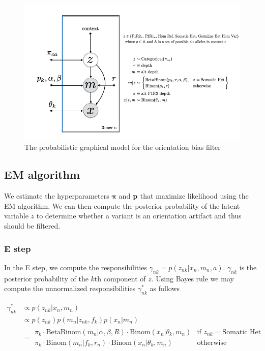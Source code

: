 \documentclass[a4paper]{article}
\newcommand{\vp}{{\bf p}}
\newcommand{\vpi}{{\bm \pi}}
\begin{document}
\begin{figure}
\centering
\includegraphics[width=1\textwidth]{pgm.png}
\caption{\label{fig:pgm} The probabilistic graphical model for the orientation bias filter}
\end{figure}


\subsection{EM algorithm}
We estimate the hyperparameters $\vpi$ and $\vp$ that maximize likelihood using the EM algorithm. We can then compute the posterior probability of the latent variable $z$ to determine whether a variant is an orientation artifact and thus should be filtered.

\subsubsection{E step}
In the E step, we compute the responsibilities $\gamma_{nk} = p(z_{nk} | x_n, m_n, a)$. $\gamma_{nk}$ is the posterior probability of the $k$th component of $z$. Using Bayes rule we may compute the unnormalized responsibilities $\gamma^*_{nk}$ as follows

\begin{align}
\gamma^*_{nk}  &\propto p(z_{nk} | x_n, m_n) \nonumber \\
		        &\propto p(z_{nk}) p(m_n | z_{nk}, f_{k} ) p(x_n | m_n ) \nonumber \\
		        &=  \begin{array}{ll}
        				\pi_{k} \cdot \mathrm{BetaBinom}(m_n | \alpha, \beta, R) \cdot \mathrm{Binom}(x_n | \theta_k, m_n) 	&\text{if } z_{nk} = \text{Somatic Het} \\
			        \pi_{k} \cdot \mathrm{Binom}(m_n | f_k, r_n) \cdot \mathrm{Binom}(x_n | \theta_k, m_n) 	&\text{otherwise}
			     \end{array}
\end{align}
\end{document}
